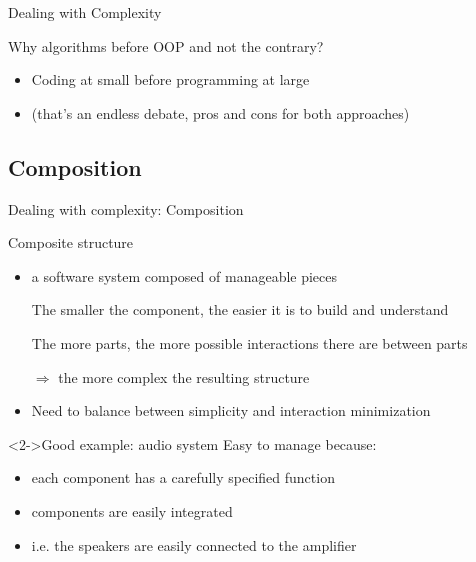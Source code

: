 \begin{frame}{Dealing with Complexity}
{    \begin{block}{Why algorithms before OOP and not the contrary?}
      \begin{itemize}\vspace{-.2\baselineskip}
      \item Coding at small before programming at large
      \item (that's an endless debate, pros and cons for both approaches)
      \end{itemize}
    \end{block}
  }
\end{frame}

\subsection{Composition}
\begin{frame}{Dealing with complexity: Composition}
  \begin{block}{Composite structure}
    \begin{itemize}
    \item {} a software system composed of
      manageable pieces
    \item[\Smiley] The smaller the component, the easier it is to
      build and understand
    \item[\Frownie] The more parts, the more possible interactions
      there are between parts
    \item[$\Rightarrow$] the more complex the resulting structure
    \item Need to balance between simplicity and interaction minimization
    \end{itemize}
  \end{block}

  \begin{block}<2->{Good example: audio system}\medskip
    Easy to manage because:
    \begin{itemize}
    \item each component has a carefully specified function
    \item components are easily integrated
    \item i.e. the speakers are easily connected to the amplifier
    \end{itemize}
  \end{block}
\end{frame}

